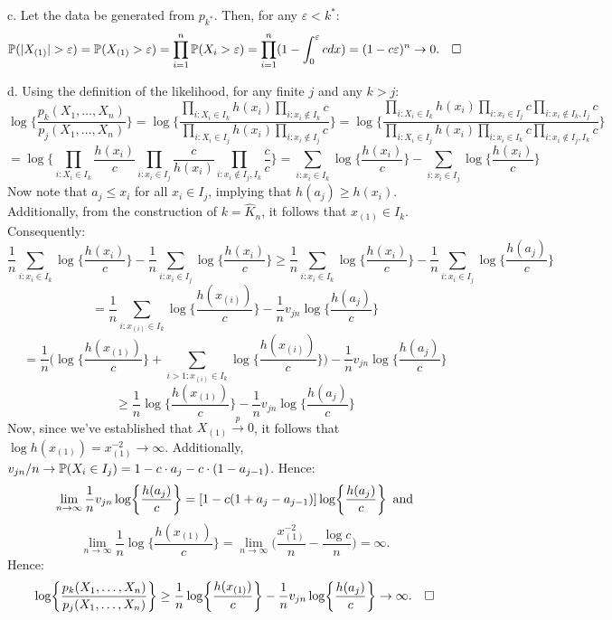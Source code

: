\documentclass[12pt]{article}
\begin{document}
\pagebreak
\noindent
c. Let the data be generated from $p_{k^*}$. Then, for any $\varepsilon < k^*$:
$$\mathbb{P}(|X_{(1)}| > \varepsilon) = \mathbb{P}(X_{(1)}>\varepsilon) = \prod\limits_{i=1}^n \mathbb{P}(X_i > \varepsilon)
= \prod_{i=1}^n (1-\int_{0}^\varepsilon c dx)
= (1-c\varepsilon)^n \to 0. \hspace{10 pt} \square$$

\noindent
d. Using the definition of the likelihood, for any finite $j$ and any $k>j$:
$$\log\biggl\{\frac{p_k(X_1,\dots,X_n)}{p_j(X_1,\dots,X_n)}\biggr\}
= \log \biggl\{\frac{\prod_{i:X_i \in I_k} h(x_i) \prod_{i:x_i \not\in I_k} c}{\prod_{i:X_i \in I_j} h(x_i) \prod_{i:x_i \not\in I_j}c}\biggr\}
= \log \biggl\{\frac{\prod_{i:X_i \in I_k} h(x_i) \prod_{i:x_i \in I_j} c \prod_{i:x_i \not\in I_k,I_j} c}
{\prod_{i:X_i \in I_j} h(x_i) \prod_{i:x_i \in I_k}c \prod_{i:x_i \not\in I_j,I_k} c}\biggr\}$$
$$= \log \biggl\{\prod_{i:X_i \in I_k} \frac{h(x_i)}{c} \prod_{i:x_i \in I_j} \frac{c}{h(x_i)} \prod_{i:x_i \not\in I_j,I_k}\frac{c}{c}\biggr\}
= \sum_{i:x_i \in I_k} \log \biggl\{\frac{h(x_i)}{c}\biggr\} - \sum_{i:x_i \in I_j} \log \biggl\{\frac{h(x_i)}{c}\biggr\}$$
Now note that $a_j \leq x_i$ for all $x_i \in I_j$, implying that $h(a_j) \geq h(x_i)$. Additionally, from the construction of $k=\hat{K}_{n}$, it follows that $x_{(1)} \in I_k$. Consequently:
$$ \frac{1}{n}\sum_{i:x_i \in I_k} \log \biggl\{\frac{h(x_i)}{c}\biggr\} - \frac{1}{n}\sum_{i:x_i \in I_j} \log \biggl\{\frac{h(x_i)}{c}\biggr\}
\geq \frac{1}{n}\sum_{i:x_i \in I_k} \log \biggl\{\frac{h(x_i)}{c}\biggr\} - \frac{1}{n}\sum_{i:x_i \in I_j} \log \biggl\{\frac{h(a_j)}{c}\biggr\}$$
$$=  \frac{1}{n}\sum_{i:x_{(i)} \in I_k} \log \biggl\{\frac{h(x_{(i)})}{c}\biggr\} - \frac{1}{n} v_{jn} \log \biggl\{\frac{h(a_j)}{c}\biggr\}$$
$$= \frac{1}{n}\biggl(\log \biggl\{\frac{h(x_{(1)})}{c}\biggr\}+\sum_{i>1:x_{(i)} \in I_k} \log \biggl\{\frac{h(x_{(i)})}{c}\biggr\}\biggr) - \frac{1}{n} v_{jn} \log \biggl\{\frac{h(a_j)}{c}\biggr\}$$
$$\geq \frac{1}{n} \log \biggl\{\frac{h(x_{(1)})}{c}\biggr\} - \frac{1}{n} v_{jn} \log \biggl\{\frac{h(a_j)}{c}\biggr\}$$
Now, since we've established that $X_{(1)}\overset{p}\to 0$, it follows that $\log h(x_{(1)}) = x_{(1)}^{-2} \to \infty$. Additionally, $v_{jn}/n \to \mathbb{P}(X_i \in I_j) = 1-c\cdot a_j-c \cdot(1-a_{j-1})$. Hence:
$$\lim\limits_{n\to\infty} \frac{1}{n} v_{jn} \log \biggl\{\frac{h(a_j)}{c}\biggr\} = [1-c(1+a_j-a_{j-1})] \log \biggl\{\frac{h(a_j)}{c}\biggr\} \hspace{5pt} {\rm and}$$
$$\lim\limits_{n\to\infty} \frac{1}{n} \log \biggl\{\frac{h(x_{(1)})}{c}\biggr\}
= \lim\limits_{n\to\infty} \biggl(\frac{x_{(1)}^{-2}}{n} - \frac{\log c}{n}\biggr) = \infty.$$
Hence:
$$\log\biggl\{\frac{p_k(X_1,\dots,X_n)}{p_j(X_1,\dots,X_n)}\biggr\}
\geq \frac{1}{n} \log \biggl\{\frac{h(x_{(1)})}{c}\biggr\} - \frac{1}{n} v_{jn} \log \biggl\{\frac{h(a_j)}{c}\biggr\}
\to \infty. \hspace{10 pt} \square$$ \\
\end{document}
